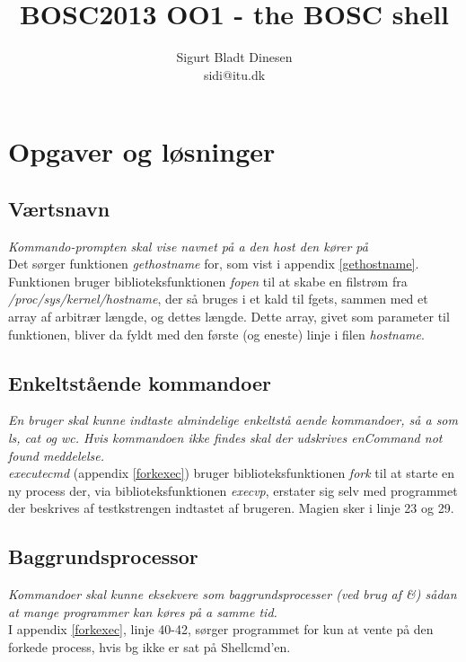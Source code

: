 \documentclass[a4paper, titlepage]{article}
\begin{document}
\title{BOSC2013 OO1 - the BOSC shell}
\author{Sigurt Bladt Dinesen \\sidi{@}itu.dk}
\maketitle
\section*{Opgaver og løsninger}
\subsection*{Værtsnavn}
\textit{Kommando-prompten skal vise navnet på a den host den kører på}\\

Det sørger funktionen \emph{gethostname} for, som vist i appendix
\ref{gethostname}. Funktionen bruger biblioteksfunktionen \emph{fopen} til at
skabe en filstrøm fra \emph{/proc/sys/\linebreak[0]kernel/hostname}, der så bruges i et kald
til fgets, sammen med et array af arbitrær længde, og dettes længde. Dette
array, givet som parameter til funktionen, bliver da fyldt med den første (og
eneste) linje i filen \emph{hostname}.

\subsection*{Enkeltstående kommandoer}
\textit{ En bruger skal kunne indtaste almindelige enkeltstå aende kommandoer, så a som
	ls, cat og wc. Hvis kommandoen ikke findes skal der udskrives enCommand
	not found meddelelse.}\\

\emph{executecmd} (appendix \ref{forkexec}) bruger biblioteksfunktionen
\emph{fork} til at starte en ny process der, via biblioteksfunktionen
\emph{execvp}, erstater sig selv med programmet der beskrives af testkstrengen
indtastet af brugeren.
Magien sker i linje 23 og 29.

\subsection*{Baggrundsprocessor}
\textit{Kommandoer skal kunne eksekvere som baggrundsprocesser (ved brug af \&)
	sådan at mange programmer kan køres på a samme tid.}\\

I appendix \ref{forkexec}, linje 40-42, sørger programmet for kun at vente på
den forkede process, hvis bg ikke er sat på Shellcmd'en.
\end{document}
